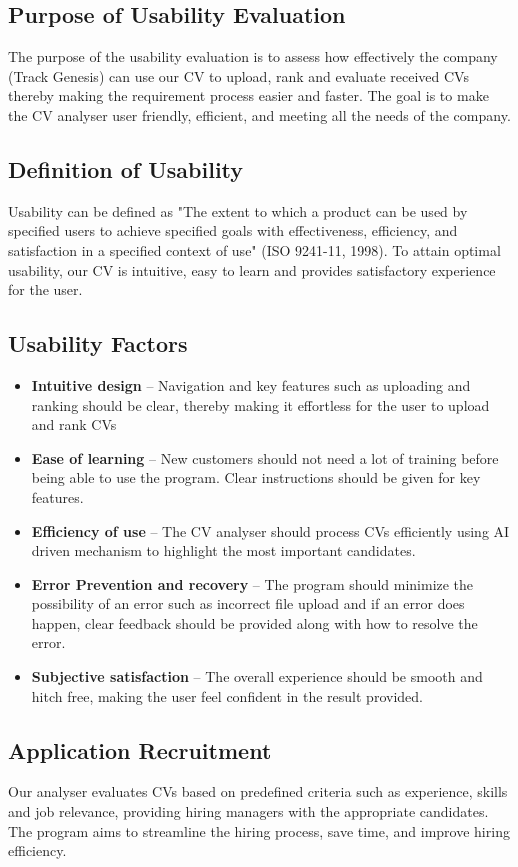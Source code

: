 \subsection{Purpose of Usability Evaluation}
    The purpose of the usability evaluation is to assess how effectively the company (Track Genesis) can use our CV to upload, rank and evaluate received CVs thereby making the requirement process easier and faster. The goal is to make the CV analyser user friendly, efficient, and meeting all the needs of the company.
\subsection{Definition of Usability}
    Usability can be defined as "The extent to which a product can be used by specified users to achieve specified goals with effectiveness, efficiency, and satisfaction in a specified context of use" \parencite{iso9241}(ISO 9241-11, 1998). To attain optimal usability, our CV is intuitive, easy to learn and provides satisfactory experience for the user.
\subsection{Usability Factors}
\begin{itemize}
    \item \textbf{Intuitive design} – Navigation and key features such as uploading and ranking should be clear, thereby making it effortless for the user to upload and rank CVs
    \item \textbf{Ease of learning} – New customers should not need a lot of training before being able to use the program. Clear instructions should be given for key features.
    \item \textbf{Efficiency of use} – The CV analyser should process CVs efficiently using AI driven mechanism to highlight the most important candidates.
    \item \textbf{Error Prevention and recovery} – The program should minimize the possibility of an error such as incorrect file upload and if an error does happen, clear feedback should be provided along with how to resolve the error.
    \item \textbf{Subjective satisfaction} – The overall experience should be smooth and hitch free, making the user feel confident in the result provided.
\end{itemize}
\subsection{Application Recruitment}
    Our analyser evaluates CVs based on predefined criteria such as experience, skills and job relevance, providing hiring managers with the appropriate candidates. The program aims to streamline the hiring process, save time, and improve hiring efficiency.